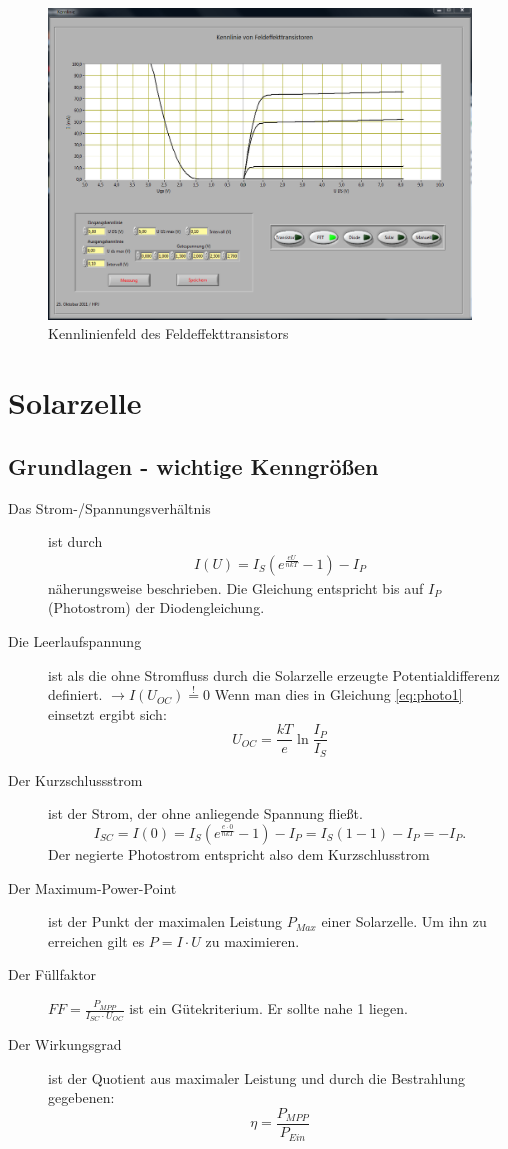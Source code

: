 \begin{figure}[t!]
    \centering
    \includegraphics[width=\linewidth]{data/FET.png}
    \caption{Kennlinienfeld des Feldeffekttransistors}
    \label{fig:fet}
\end{figure}

\section{Solarzelle}

\subsection*{Grundlagen - wichtige Kenngrößen}
\begin{description}
\item[Das Strom-/Spannungsverhältnis] ist durch 
\begin{eqnarray}\label{eq:photo1}
    I(U)=I_S\left( e^{\frac{eU}{nkT}} -1 \right) - I_P
\end{eqnarray}
näherungsweise beschrieben. Die Gleichung entspricht bis auf $I_P$ (Photostrom) der Diodengleichung.
\item[Die Leerlaufspannung] ist als die ohne Stromfluss durch die Solarzelle erzeugte Potentialdifferenz definiert. $\rightarrow I(U_{OC})\stackrel{!}{=}0$ Wenn man dies in Gleichung \ref{eq:photo1} einsetzt ergibt sich:
$$U_{OC}=\frac{kT}{e}\ln\frac{I_P}{I_S}$$
\item[Der Kurzschlussstrom] ist der Strom, der ohne anliegende Spannung fließt.
$$I_{SC}=I(0)=I_S\left( e^{\frac{e\cdot0}{nkT}} -1 \right) - I_P=I_S\left(1-1 \right) - I_P=-I_P.$$
Der negierte Photostrom entspricht also dem Kurzschlusstrom
\item[Der Maximum-Power-Point] ist der Punkt der maximalen Leistung $P_{Max}$ einer Solarzelle. Um ihn zu erreichen gilt es $P=I\cdot U$ zu maximieren.
\item[Der Füllfaktor] $FF=\frac{P_{MPP}}{I_{SC}\cdot U_{OC}}$ ist ein Gütekriterium. Er sollte nahe 1 liegen.
\item[Der Wirkungsgrad] ist der Quotient aus maximaler Leistung und durch die Bestrahlung gegebenen:$$\eta=\frac{P_{MPP}}{P_{Ein}}$$
\end{description}

